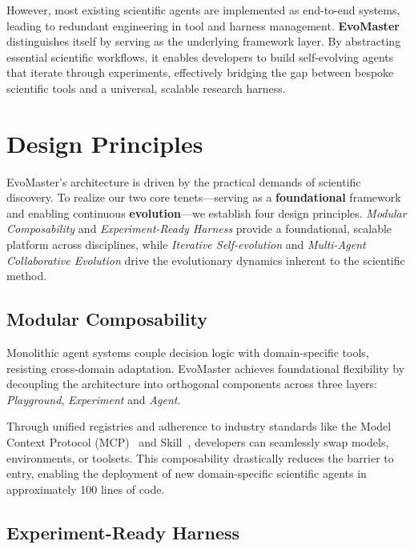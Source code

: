\documentclass[11pt, a4paper, logo, copyright, nonumbering]{cls/Sci}
\begin{document}
However, most existing scientific agents are implemented as end-to-end systems, leading to redundant engineering in tool and harness management. \textbf{EvoMaster} distinguishes itself by serving as the underlying framework layer. By abstracting essential scientific workflows, it enables developers to build self-evolving agents that iterate through experiments, effectively bridging the gap between bespoke scientific tools and a universal, scalable research harness.


\section{Design Principles}
\label{sec:principles}

EvoMaster's architecture is driven by the practical demands of scientific discovery. To realize our two core tenets—serving as a \textbf{foundational} framework and enabling continuous \textbf{evolution}—we establish four design principles. \textit{Modular Composability} and \textit{Experiment-Ready Harness} provide a foundational, scalable platform across disciplines, while \textit{Iterative Self-evolution} and \textit{Multi-Agent Collaborative Evolution} drive the evolutionary dynamics inherent to the scientific method.

\subsection{Modular Composability}

Monolithic agent systems couple decision logic with domain-specific tools, resisting cross-domain adaptation. EvoMaster achieves foundational flexibility by decoupling the architecture into orthogonal components across three layers: \textit{Playground}, \textit{Experiment} and \textit{Agent}.

Through unified registries and adherence to industry standards like the Model Context Protocol (MCP)~\citep{mcp2025} and Skill~\citep{anthropic2025skills}, developers can seamlessly swap models, environments, or toolsets. This composability drastically reduces the barrier to entry, enabling the deployment of new domain-specific scientific agents in approximately 100 lines of code.

\subsection{Experiment-Ready Harness}
\end{document}
